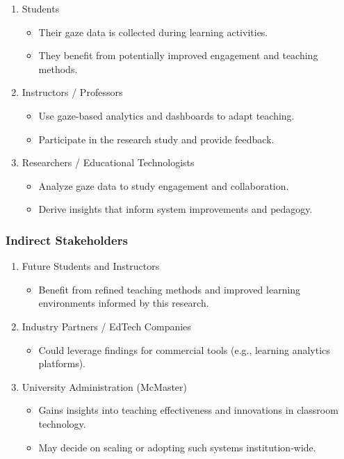 \documentclass{article}
\begin{document}
\begin{enumerate}
    \item Students
    \begin{itemize}
        \item Their gaze data is collected during learning activities.
        \item They benefit from potentially improved engagement and teaching methods.
    \end{itemize}

    \item Instructors / Professors
    \begin{itemize}
        \item Use gaze-based analytics and dashboards to adapt teaching.
        \item Participate in the research study and provide feedback.
    \end{itemize}

    \item Researchers / Educational Technologists
    \begin{itemize}
        \item Analyze gaze data to study engagement and collaboration.
        \item Derive insights that inform system improvements and pedagogy.
    \end{itemize}
\end{enumerate}

\subsubsection*{Indirect Stakeholders}

\begin{enumerate}
    \item Future Students and Instructors
    \begin{itemize}
        \item Benefit from refined teaching methods and improved learning environments informed by this research.
    \end{itemize}

    \item Industry Partners / EdTech Companies
    \begin{itemize}
        \item Could leverage findings for commercial tools (e.g., learning analytics platforms).
    \end{itemize}

    \item University Administration (McMaster)
    \begin{itemize}
        \item Gains insights into teaching effectiveness and innovations in classroom technology.
        \item May decide on scaling or adopting such systems institution-wide.
    \end{itemize}
\end{enumerate}
\end{document}
